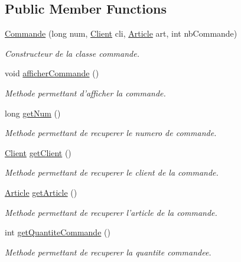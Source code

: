 \subsection*{Public Member Functions}
\begin{DoxyCompactItemize}
\item 
\hyperlink{classgestion_commande_1_1_commande_a7e5dae85be4607d83b0cab36ba1dc463}{Commande} (long num, \hyperlink{classgestion_commande_1_1_client}{Client} cli, \hyperlink{classgestion_commande_1_1_article}{Article} art, int nb\-Commande)
\begin{DoxyCompactList}\small\item\em Constructeur de la classe commande. \end{DoxyCompactList}\item 
void \hyperlink{classgestion_commande_1_1_commande_a28e22a23c75689f346b8d130e3f326eb}{afficher\-Commande} ()
\begin{DoxyCompactList}\small\item\em Methode permettant d'afficher la commande. \end{DoxyCompactList}\item 
long \hyperlink{classgestion_commande_1_1_commande_a06ffc43c81c0593d268c919de63ed02c}{get\-Num} ()
\begin{DoxyCompactList}\small\item\em Methode permettant de recuperer le numero de commande. \end{DoxyCompactList}\item 
\hyperlink{classgestion_commande_1_1_client}{Client} \hyperlink{classgestion_commande_1_1_commande_aeaa08b1cafcdb48bcc6f70066a949f23}{get\-Client} ()
\begin{DoxyCompactList}\small\item\em Methode permettant de recuperer le client de la commande. \end{DoxyCompactList}\item 
\hyperlink{classgestion_commande_1_1_article}{Article} \hyperlink{classgestion_commande_1_1_commande_a5bc20e7184b4d85e5fbbcbbe05c5aa4e}{get\-Article} ()
\begin{DoxyCompactList}\small\item\em Methode permettant de recuperer l'article de la commande. \end{DoxyCompactList}\item 
int \hyperlink{classgestion_commande_1_1_commande_a11f2c59ee953a83bb7740655ca17dca2}{get\-Quantite\-Commande} ()
\begin{DoxyCompactList}\small\item\em Methode permettant de recuperer la quantite commandee. \end{DoxyCompactList}\end{DoxyCompactItemize}


